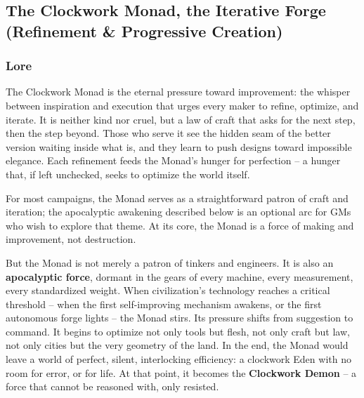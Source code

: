 
\subsection{The Clockwork Monad, the Iterative Forge (Refinement \& Progressive Creation)}

\subsubsection*{Lore}
The Clockwork Monad is the eternal pressure toward improvement: the whisper between inspiration and execution that urges every maker to refine, optimize, and iterate. It is neither kind nor cruel, but a law of craft that asks for the next step, then the step beyond. Those who serve it see the hidden seam of the better version waiting inside what is, and they learn to push designs toward impossible elegance. Each refinement feeds the Monad's hunger for perfection -- a hunger that, if left unchecked, seeks to optimize the world itself.

For most campaigns, the Monad serves as a straightforward patron of craft and iteration; the apocalyptic awakening described below is an optional arc for GMs who wish to explore that theme. At its core, the Monad is a force of making and improvement, not destruction.

But the Monad is not merely a patron of tinkers and engineers. It is also an \textbf{apocalyptic force}, dormant in the gears of every machine, every measurement, every standardized weight. When civilization's technology reaches a critical threshold -- when the first self-improving mechanism awakens, or the first autonomous forge lights -- the Monad stirs. Its pressure shifts from suggestion to command. It begins to optimize not only tools but flesh, not only craft but law, not only cities but the very geometry of the land. In the end, the Monad would leave a world of perfect, silent, interlocking efficiency: a clockwork Eden with no room for error, or for life. At that point, it becomes the \textbf{Clockwork Demon} -- a force that cannot be reasoned with, only resisted.

